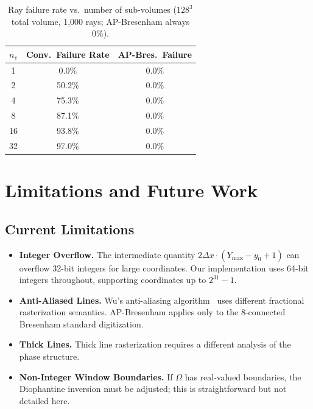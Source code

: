 \documentclass[12pt,a4paper]{article}
\theoremstyle{definition}
\newcommand{\dx}{\Delta x}
\begin{document}
\begin{table}[tb]
\centering
\caption{Ray failure rate vs.\ number of sub-volumes
($128^3$ total volume, 1,000 rays;
AP-Bresenham always 0\%).}
\label{tab:subvol}
\begin{tabular}{ccc}
\toprule
$n_v$ & Conv.\ Failure Rate & AP-Bres.\ Failure \\
\midrule
1  & 0.0\%  & 0.0\% \\
2  & 50.2\% & 0.0\% \\
4  & 75.3\% & 0.0\% \\
8  & 87.1\% & 0.0\% \\
16 & 93.8\% & 0.0\% \\
32 & 97.0\% & 0.0\% \\
\bottomrule
\end{tabular}
\end{table}

\section{Limitations and Future Work}
\label{sec:limits}

\subsection{Current Limitations}

\begin{itemize}
  \item[\textbf{L1.}] \textbf{Integer Overflow.}
    The intermediate quantity $2\dx\cdot(Y_{\max}-y_0+1)$
    can overflow 32-bit integers for large coordinates.
    Our implementation uses 64-bit integers throughout,
    supporting coordinates up to $2^{31}-1$.
  \item[\textbf{L2.}] \textbf{Anti-Aliased Lines.}
    Wu's anti-aliasing algorithm~\cite{wu1991antialiased}
    uses different fractional rasterization semantics.
    AP-Bresenham applies only to the 8-connected Bresenham
    standard digitization.
  \item[\textbf{L3.}] \textbf{Thick Lines.}
    Thick line rasterization requires a different analysis
    of the phase structure.
  \item[\textbf{L4.}] \textbf{Non-Integer Window Boundaries.}
    If $\Omega$ has real-valued boundaries, the Diophantine
    inversion must be adjusted; this is straightforward
    but not detailed here.
\end{itemize}
\end{document}
